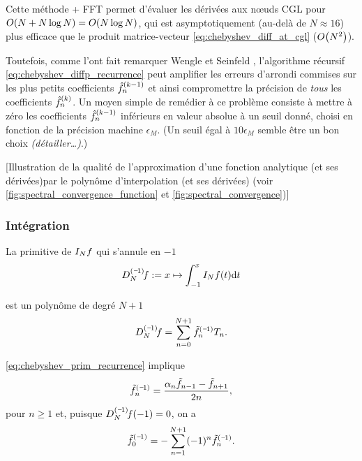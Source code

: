 Cette méthode + FFT permet d'évaluer les dérivées aux n\oe uds CGL pour $\bigO{N + N \log N} = \bigO{N \log N}$, qui est asymptotiquement (au-delà de $N \approx 16$) plus efficace que le produit matrice-vecteur \eqref{eq:chebyshev_diff_at_cgl} ($\bigO{N^2}$).
\par
Toutefois, comme l'ont fait remarquer Wengle et Seinfeld \cite{wengle1978}, l'algorithme récursif \eqref{eq:chebyshev_diffp_recurrence} peut amplifier les erreurs d'arrondi commises sur les plus petits coefficients $\deriv{\hat{f}}{k-1}_{n}$ et ainsi compromettre la précision de \emph{tous} les coefficients $\deriv{\hat{f}}{k}_{n}$. 
Un moyen simple de remédier à ce problème consiste à mettre à zéro les coefficients $\deriv{\hat{f}}{k-1}_{n}$ inférieurs en valeur absolue à un seuil donné, choisi en fonction de la précision machine $\epsilon_M$. 
(Un seuil égal à $10 \epsilon_M$ semble être un bon choix \textit{(détailler\ldots)}.)

\par\bigskip

[Illustration de la qualité de l'approximation d'une fonction analytique (et ses dérivées)par le polynôme d'interpolation (et ses dérivées) (voir \autoref{fig:spectral_convergence_function} et \autoref{fig:spectral_convergence})]






\subsubsection{Intégration}
\label{section:clenshaw_curtis_quadrature}
La primitive de $\interpolant{f}{N}$ qui s'annule en $-1$
\begin{equation}
	\interpprim{f}{N} := x \mapsto \int_{-1}^{x} \interpolant{f}{N}(t) \dx{t}
\end{equation}

est un polynôme de degré $N+1$
\begin{equation}
	\interpprim{f}{N} = \sum_{n=0}^{N+1} \prim{\tilde{f}}{1}_n T_n.
\end{equation}

\eqref{eq:chebyshev_prim_recurrence} implique 
\begin{equation}
	\prim{\tilde{f}}{1}_n = \frac{\alpha_n \tilde{f}_{n-1} - \tilde{f}_{n+1}}{2n},
\end{equation}
pour $n \geq 1$ et, puisque $\interpprim{f}{N}(-1) = 0$, on a
\begin{equation}
	\prim{\tilde{f}}{1}_0 = - \sum_{n=1}^{N+1} (-1)^n \prim{\tilde{f}}{1}_n.
\end{equation}

